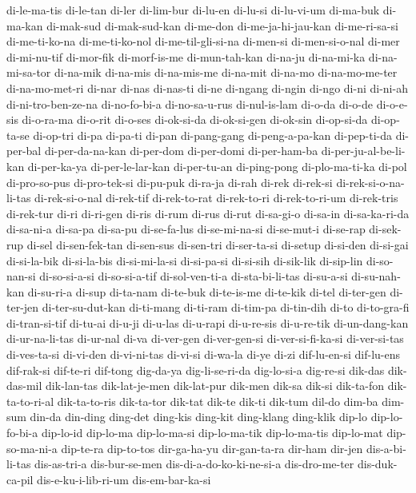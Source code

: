 {di-le-ma-tis di-le-tan di-ler di-lim-bur di-lu-en di-lu-si di-lu-vi-um
di-ma-buk di-ma-kan di-mak-sud di-mak-sud-kan di-me-don
di-me-ja-hi-jau-kan di-me-ri-sa-si di-me-ti-ko-na di-me-ti-ko-nol
di-me-til-gli-si-na di-men-si di-men-si-o-nal di-mer di-mi-nu-tif
di-mor-fik di-morf-is-me di-mun-tah-kan di-na-ju di-na-mi-ka
di-na-mi-sa-tor di-na-mik di-na-mis di-na-mis-me di-na-mit di-na-mo
di-na-mo-me-ter di-na-mo-met-ri di-nar di-nas di-nas-ti di-ne di-ngang
di-ngin di-ngo di-ni di-ni-ah di-ni-tro-ben-ze-na di-no-fo-bi-a
di-no-sa-u-rus di-nul-is-lam di-o-da di-o-de di-o-e-sis di-o-ra-ma
di-o-rit di-o-ses di-ok-si-da di-ok-si-gen di-ok-sin di-op-si-da
di-op-ta-se di-op-tri di-pa di-pa-ti di-pan di-pang-gang di-peng-a-pa-kan
di-pep-ti-da di-per-bal di-per-da-na-kan di-per-dom di-per-domi
di-per-ham-ba di-per-ju-al-be-li-kan di-per-ka-ya di-per-le-lar-kan
di-per-tu-an di-ping-pong di-plo-ma-ti-ka di-pol di-pro-so-pus
di-pro-tek-si di-pu-puk di-ra-ja di-rah di-rek di-rek-si
di-rek-si-o-na-li-tas di-rek-si-o-nal di-rek-tif di-rek-to-rat
di-rek-to-ri di-rek-to-ri-um di-rek-tris di-rek-tur di-ri di-ri-gen di-ris
di-rum di-rus di-rut di-sa-gi-o di-sa-in di-sa-ka-ri-da di-sa-ni-a
di-sa-pa di-sa-pu di-se-fa-lus di-se-mi-na-si di-se-mut-i di-se-rap
di-sek-rup di-sel di-sen-fek-tan di-sen-sus di-sen-tri di-ser-ta-si
di-setup di-si-den di-si-gai di-si-la-bik di-si-la-bis di-si-mi-la-si
di-si-pa-si di-si-sih di-sik-lik di-sip-lin di-so-nan-si di-so-si-a-si
di-so-si-a-tif di-sol-ven-ti-a di-sta-bi-li-tas di-su-a-si di-su-nah-kan
di-su-ri-a di-sup di-ta-nam di-te-buk di-te-is-me di-te-kik di-tel
di-ter-gen di-ter-jen di-ter-su-dut-kan di-ti-mang di-ti-ram di-tim-pa
di-tin-dih di-to di-to-gra-fi di-tran-si-tif di-tu-ai di-u-ji di-u-las
di-u-rapi di-u-re-sis di-u-re-tik di-un-dang-kan di-ur-na-li-tas di-ur-nal
di-va di-ver-gen di-ver-gen-si di-ver-si-fi-ka-si di-ver-si-tas
di-ves-ta-si di-vi-den di-vi-ni-tas di-vi-si di-wa-la di-ye di-zi
dif-lu-en-si dif-lu-ens dif-rak-si dif-te-ri dif-tong dig-da-ya
dig-li-se-ri-da dig-lo-si-a dig-re-si dik-das dik-das-mil dik-lan-tas
dik-lat-je-men dik-lat-pur dik-men dik-sa dik-si dik-ta-fon
dik-ta-to-ri-al dik-ta-to-ris dik-ta-tor dik-tat dik-te dik-ti dik-tum
dil-do dim-ba dim-sum din-da din-ding ding-det ding-kis ding-kit
ding-klang ding-klik dip-lo dip-lo-fo-bi-a dip-lo-id dip-lo-ma
dip-lo-ma-si dip-lo-ma-tik dip-lo-ma-tis dip-lo-mat dip-so-ma-ni-a
dip-te-ra dip-to-tos dir-ga-ha-yu dir-gan-ta-ra dir-ham dir-jen
dis-a-bi-li-tas dis-as-tri-a dis-bur-se-men dis-di-a-do-ko-ki-ne-si-a
dis-dro-me-ter dis-duk-ca-pil dis-e-ku-i-lib-ri-um dis-em-bar-ka-si
}
